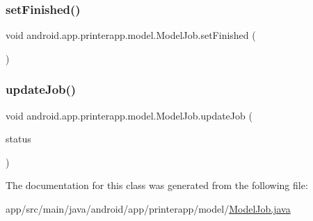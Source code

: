 \subsubsection{\texorpdfstring{set\+Finished()}{setFinished()}}
{\footnotesize\ttfamily void android.\+app.\+printerapp.\+model.\+Model\+Job.\+set\+Finished (\begin{DoxyParamCaption}{ }\end{DoxyParamCaption})}

\mbox{\label{classandroid_1_1app_1_1printerapp_1_1model_1_1_model_job_a428beabe9954369e500df644ad220a6f}} 
\subsubsection{\texorpdfstring{update\+Job()}{updateJob()}}
{\footnotesize\ttfamily void android.\+app.\+printerapp.\+model.\+Model\+Job.\+update\+Job (\begin{DoxyParamCaption}\item[{J\+S\+O\+N\+Object}]{status }\end{DoxyParamCaption})}



The documentation for this class was generated from the following file\+:\begin{DoxyCompactItemize}
\item 
app/src/main/java/android/app/printerapp/model/\hyperlink{_model_job_8java}{Model\+Job.\+java}\end{DoxyCompactItemize}
